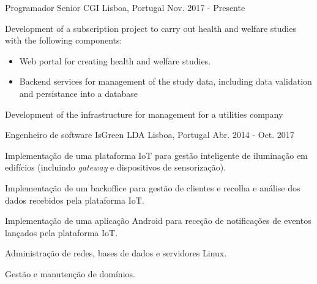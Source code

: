 


\begin{cventries}


\cventry
{Programador Senior}
{CGI}
{Lisboa, Portugal}
{Nov. 2017 - Presente}
{
    \begin{cvitems}
        \item {Development of a subscription project to carry out health and welfare studies with the following components:}
         \begin{itemize}
            \item {Web portal for creating health and welfare studies.}
            \item {Backend services for management of the study data, including data validation and persistance into a database}
        \end{itemize}
        \item {Development of the infrastructure for management for a utilities company}
    \end{cvitems}
}

\cventry
{Engenheiro de software} %
{IsGreen LDA} %
{Lisboa, Portugal} %
{Abr. 2014 - Oct. 2017} %
{ %
    \begin{cvitems}
        \item {Implementação de uma plataforma IoT para gestão inteligente de iluminação em edifícios (incluindo \textit{gateway} e dispositivos de sensorização).}
        \item {Implementação de um backoffice para gestão de clientes e recolha e análise dos dados recebidos pela plataforma IoT.}
        \item {Implementação de uma aplicação Android para receção de notificações de eventos lançados pela plataforma IoT.}
        \item {Administração de redes, bases de dados e servidores Linux.}
        \item {Gestão e manutenção de domínios.}
    \end{cvitems}
}

\end{cventries}